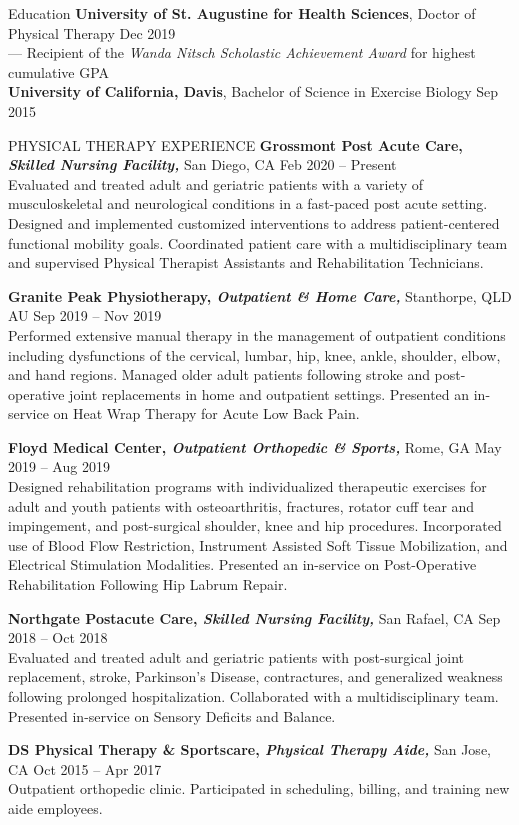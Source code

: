 \documentclass{resume} %
\begin{document}
\vspace{-15pt}
\begin{rSection}{Education}
\textbf{University of St. Augustine for Health Sciences}, Doctor of Physical Therapy \hfill {Dec 2019}
\\
\-\hspace{5mm} --- Recipient of the \textit{Wanda Nitsch Scholastic Achievement Award} for highest cumulative GPA
\\
\textbf{University of California, Davis}, Bachelor of Science in Exercise Biology \hfill {Sep 2015}
\end{rSection}
\begin{rSection}{PHYSICAL THERAPY EXPERIENCE}
\textbf{Grossmont Post Acute Care, \textit{Skilled Nursing Facility,}} San Diego, CA
\hfill Feb 2020 -- Present\\
Evaluated and treated adult and geriatric patients with a variety of musculoskeletal and neurological conditions in a fast-paced post acute setting. Designed and implemented customized interventions to address patient-centered functional mobility goals. Coordinated patient care with a multidisciplinary team and supervised Physical Therapist Assistants and Rehabilitation Technicians. 

\textbf{Granite Peak Physiotherapy, \textit{Outpatient \& Home Care,}} Stanthorpe, QLD AU
\hfill Sep 2019 -- Nov 2019\\
Performed extensive manual therapy in the management of outpatient conditions including dysfunctions of the cervical, lumbar, hip, knee, ankle, shoulder, elbow, and hand regions. Managed older adult patients following stroke and post-operative joint replacements in home and outpatient settings. Presented an in-service on Heat Wrap Therapy for Acute Low Back Pain.

\textbf{Floyd Medical Center, \textit{Outpatient Orthopedic \& Sports,}} Rome, GA
\hfill May 2019 -- Aug 2019 \\
Designed rehabilitation programs with individualized therapeutic exercises for adult and youth patients with osteoarthritis, fractures, rotator cuff tear and impingement, and post-surgical shoulder, knee and hip procedures. Incorporated use of Blood Flow Restriction, Instrument Assisted Soft Tissue Mobilization, and Electrical Stimulation Modalities. Presented an in-service on Post-Operative Rehabilitation Following Hip Labrum Repair.

\textbf{Northgate Postacute Care, \textit{Skilled Nursing Facility,}} San Rafael, CA
\hfill Sep 2018 -- Oct 2018\\
Evaluated and treated adult and geriatric patients with post-surgical joint replacement, stroke, Parkinson's Disease, contractures, and generalized weakness following prolonged hospitalization. Collaborated with a multidisciplinary team. Presented in-service on Sensory Deficits and Balance.

\textbf{DS Physical Therapy \& Sportscare, \textit{Physical Therapy Aide,}} San Jose, CA
\hfill Oct 2015 -- Apr 2017\\
Outpatient orthopedic clinic. Participated in scheduling, billing, and training new aide employees.
\end{rSection} 
\end{document}
